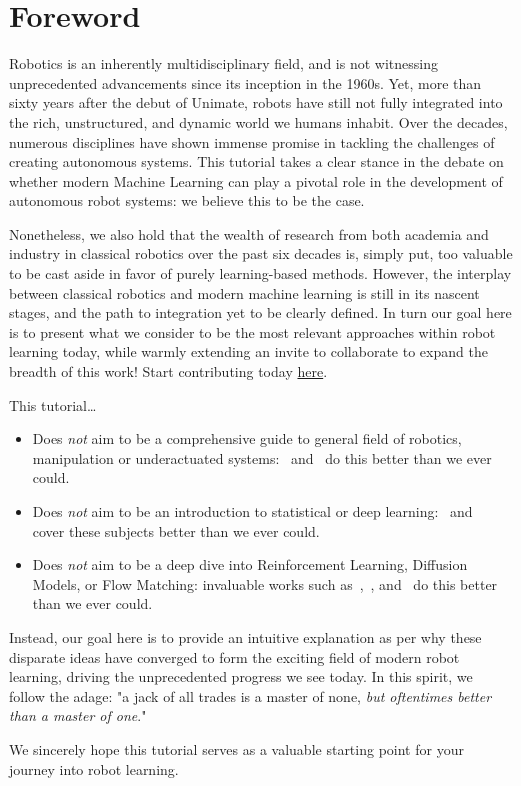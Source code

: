 \section*{Foreword}

Robotics is an inherently multidisciplinary field, and is not witnessing unprecedented advancements since its inception in the 1960s.
Yet, more than sixty years after the debut of Unimate, robots have still not fully integrated into the rich, unstructured, and dynamic world we humans inhabit.
Over the decades, numerous disciplines have shown immense promise in tackling the challenges of creating autonomous systems.
This tutorial takes a clear stance in the debate on whether modern Machine 
Learning can play a pivotal role in the development of 
autonomous robot systems: we believe this to be the case.

Nonetheless, we also hold that the wealth of research from both academia and industry in classical robotics over the past six decades is, simply put, too valuable to be cast aside in favor of purely learning-based methods.
However, the interplay between classical robotics and modern machine learning is still in its nascent stages, and the path to integration yet to be clearly defined.
In turn our goal here is to present what we consider to be the most relevant approaches within robot learning today, while warmly extending an invite to collaborate to expand the breadth of this work! Start contributing today \href{https://github.com/fracapuano/robot-learning-tutorial}{here}.

This tutorial\dots
\begin{itemize}
    \item Does \emph{not} aim to be a comprehensive guide to general field of robotics, manipulation or underactuated systems:~\citet{sicilianoSpringerHandbookRobotics2016} and~\citet{tedrakeRoboticManipulationPerception,tedrakeUnderactuatedRoboticsAlgorithms} do this better than we ever could.
    \item Does \emph{not} aim to be an introduction to statistical or deep learning:~\citet{shalev-shwartzUnderstandingMachineLearning2014} and~\citet{prince2023understanding} cover these subjects better than we ever could.
    \item Does \emph{not} aim to be a deep dive into Reinforcement Learning, Diffusion Models, or Flow Matching: invaluable works such as~\citet{suttonReinforcementLearningIntroduction2018},~\citet{nakkiranStepbyStepDiffusionElementary2024}, and~\citet{lipmanFlowMatchingGuide2024} do this better than we ever could.
\end{itemize}

Instead, our goal here is to provide an intuitive explanation as per why these disparate ideas have converged to form the exciting field of modern robot learning, driving the unprecedented progress we see today. 
In this spirit, we follow the adage: "a jack of all trades is a master of none, \emph{but oftentimes better than a master of one}."

We sincerely hope this tutorial serves as a valuable starting point for your journey into robot learning.